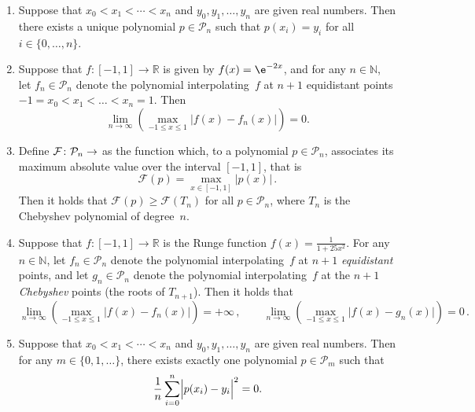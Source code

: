 \documentclass[a4paper]{article}
\begin{document}
\begin{enumerate}

    \item
        Suppose that $x_0 < x_1 < \dotsb < x_n$ and $y_0, y_1, \dotsc, y_n$ are given real numbers.
        Then there exists a unique polynomial $p \in \mathcal P_n$ such that $p(x_i) = y_i$ for all $i \in \{0, \dotsc, n\}$.

    \item
        Suppose that $f \colon [-1, 1] \to \mathbb R$ is given by $f(x) = \e^{-2x}$,
        and for any $n \in \mathbb N$,
        let $f_n \in \mathcal P_n$ denote the polynomial interpolating~$f$ at $n+1$ equidistant points $-1 = x_0 < x_1 < \dotsc < x_n = 1$.
        Then
        \[
            \lim_{n \to \infty} \left( \max_{-1 \leq x \leq 1} \bigl\lvert f(x) - f_n(x) \bigr\rvert \right) = 0.
        \]

    \item
        Define $\mathcal F \colon \mathcal P_n \to \real$ as the function which,
        to a polynomial $p \in \mathcal P_n$, associates its maximum absolute value over the interval $[-1, 1]$,
        that is
        \[
            \mathcal F(p) = \max_{x \in [-1, 1]} \left\lvert p(x) \right\rvert \, .
        \]
        Then it holds that $\mathcal F(p) \geq \mathcal F(T_n)$ for all $p \in \mathcal P_n$,
        where $T_n$ is the Chebyshev polynomial of degree~$n$.


    \item
        Suppose that $f \colon [-1, 1] \to \mathbb R$ is the Runge function $f(x) = \frac{1}{1 + 25 x^2}$.
        For any $n \in \mathbb N$,
        let $f_n \in \mathcal P_n$ denote the polynomial interpolating~$f$ at $n+1$ \emph{equidistant} points,
        and let $g_n \in \mathcal P_n$ denote the polynomial interpolating~$f$ at the $n+1$ \emph{Chebyshev} points (the roots of $T_{n+1}$).
        Then it holds that
        \[
            \lim_{n \to \infty} \left( \max_{-1 \leq x \leq 1} \bigl\lvert f(x) - f_n(x) \bigr\rvert \right) = +\infty \, ,
            \qquad
            \lim_{n \to \infty} \left( \max_{-1 \leq x \leq 1} \bigl\lvert f(x) - g_n(x) \bigr\rvert \right) = 0 \, .
        \]

    \item
        Suppose that $x_0 < x_1 < \dotsb < x_n$ and $y_0, y_1, \dotsc, y_n$ are given real numbers.
        Then for any $m \in \{0, 1, \dotsc\}$,
        there exists exactly one polynomial $p \in \mathcal P_m$ such that 
        \[
            \frac{1}{n} \sum_{i=0}^{n} \Bigl\lvert p(x_i) - y_i \Bigr\rvert^2 = 0.
        \]


\end{enumerate}
\end{document}
